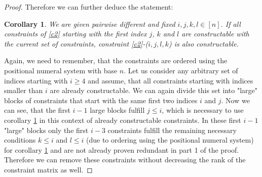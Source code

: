 \documentclass{scrartcl}
\newtheorem{corollary}{Corollary}
\theoremstyle{plain}
\begin{document}
\begin{proof}
	Therefore we can further deduce the statement: 
	
	\begin{mdframed}
	\begin{corollary}\label{cor2}
	We are given pairwise different and fixed $i,j,k,l \in [n]$. If all constraints of \eqref{c2} starting with the first index $j$, $k$ and $l$ are constructable with the current set of constraints, constraint \eqref{c2}-($i,j,l,k$) is also constructable.
	\end{corollary}
	\vspace{7pt}
	\end{mdframed}
	
	Again, we need to remember, that the constraints are ordered using the positional numeral system with base $n$. Let us consider any arbitrary set of indices starting with $i \geq 4$ and assume, that all constraints starting with indices smaller than $i$ are already constructable. We can again divide this set into "large" blocks of constraints that start with the same first two indices $i$ and $j$. Now we can see, that the first $i-1$ large blocks fulfill $j \leq i$, which is necessary to use corollary \ref{cor2} in this context of already constructable constraints. In these first $i-1$ "large" blocks only the first $i-3$ constraints fulfill the remaining necessary conditions $k \leq i$ and $l \leq i$ (due to ordering using the positional numeral system) for corollary \ref{cor2} and are not already proven redundant in part 1 of the proof. Therefore we can remove these constraints without decreasing the rank of the constraint matrix as well.
	

\end{proof}
\end{document}
